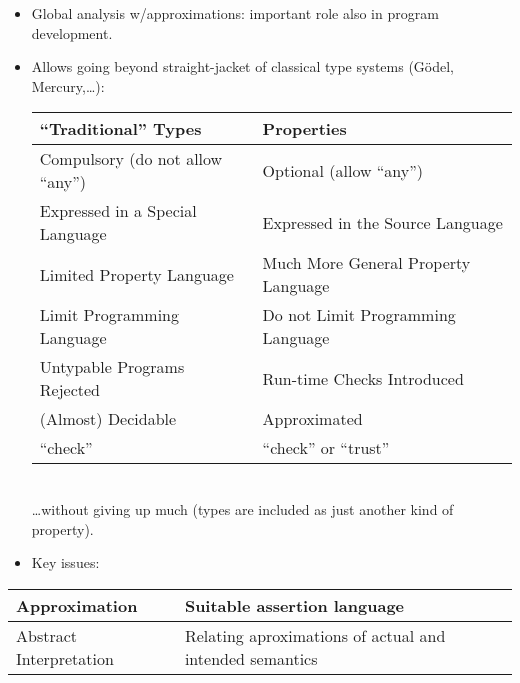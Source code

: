 \documentclass{article}
\renewcommand{\_}{\char'137}
\begin{document}
\begin{itemize}
\item Global analysis 
w/approximations:
important role 
also in 
program development.

\item Allows going beyond straight-jacket of classical 
type systems (G\"{o}del, Mercury,\ldots):\\[3mm]
\begin{tabular}{||l|l||}
\hline
\hline
{\bf ``Traditional'' Types}               & {\bf Properties} \\
\hline
\hline
Compulsory (do not allow ``any'')  & Optional  (allow ``any'') \\
\hline
Expressed in a Special Language & Expressed in the Source Language \\
\hline
Limited Property Language       & Much More General Property Language \\
\hline
Limit Programming Language      & Do not Limit Programming Language \\
\hline
Untypable Programs Rejected     & Run-time Checks Introduced  \\
\hline
(Almost) Decidable              & Approximated \\
\hline
``check''                       & ``check'' or ``trust''  \\
\hline
\hline
\end{tabular}
\\[3mm]
\ldots without giving up much (types are included as just another kind of property).

\item Key issues:
\end{itemize}
\begin{tabular}{||l||l||}
\hline
\hline
Approximation            & Suitable assertion language \\
\hline
Abstract Interpretation  & Relating aproximations of actual and intended semantics\\
\hline
\hline
\end{tabular}

\end{document}
